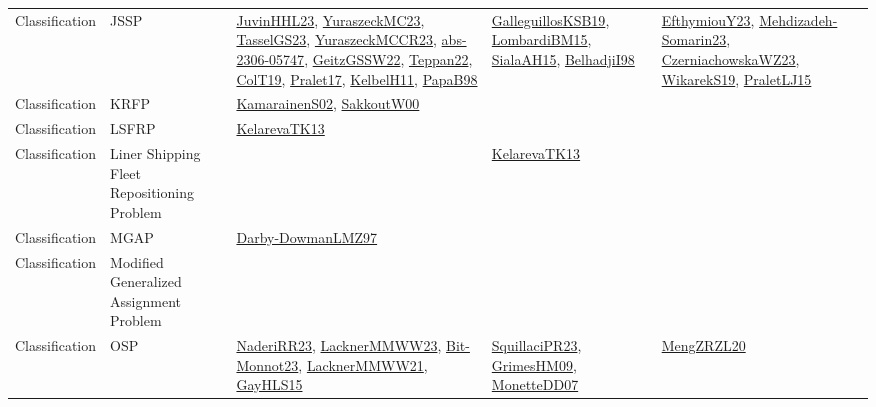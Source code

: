{\begin{longtable}{lp{3cm}>{\raggedright}p{6cm}>{\raggedright}p{6cm}p{8cm}}
Classification & JSSP & \href{papers/JuvinHHL23.pdf}{JuvinHHL23}\cite{JuvinHHL23}, \href{papers/YuraszeckMC23.pdf}{YuraszeckMC23}\cite{YuraszeckMC23}, \href{papers/TasselGS23.pdf}{TasselGS23}\cite{TasselGS23}, \href{articles/YuraszeckMCCR23.pdf}{YuraszeckMCCR23}\cite{YuraszeckMCCR23}, \href{articles/abs-2306-05747.pdf}{abs-2306-05747}\cite{abs-2306-05747}, \href{papers/GeitzGSSW22.pdf}{GeitzGSSW22}\cite{GeitzGSSW22}, \href{papers/Teppan22.pdf}{Teppan22}\cite{Teppan22}, \href{papers/ColT19.pdf}{ColT19}\cite{ColT19}, \href{papers/Pralet17.pdf}{Pralet17}\cite{Pralet17}, \href{articles/KelbelH11.pdf}{KelbelH11}\cite{KelbelH11}, \href{articles/PapaB98.pdf}{PapaB98}\cite{PapaB98} & \href{papers/GalleguillosKSB19.pdf}{GalleguillosKSB19}\cite{GalleguillosKSB19}, \href{papers/LombardiBM15.pdf}{LombardiBM15}\cite{LombardiBM15}, \href{papers/SialaAH15.pdf}{SialaAH15}\cite{SialaAH15}, \href{articles/BelhadjiI98.pdf}{BelhadjiI98}\cite{BelhadjiI98} & \href{papers/EfthymiouY23.pdf}{EfthymiouY23}\cite{EfthymiouY23}, \href{papers/Mehdizadeh-Somarin23.pdf}{Mehdizadeh-Somarin23}\cite{Mehdizadeh-Somarin23}, \href{articles/CzerniachowskaWZ23.pdf}{CzerniachowskaWZ23}\cite{CzerniachowskaWZ23}, \href{articles/WikarekS19.pdf}{WikarekS19}\cite{WikarekS19}, \href{papers/PraletLJ15.pdf}{PraletLJ15}\cite{PraletLJ15}\\
Classification & KRFP & \href{papers/KamarainenS02.pdf}{KamarainenS02}\cite{KamarainenS02}, \href{articles/SakkoutW00.pdf}{SakkoutW00}\cite{SakkoutW00} &  & \\
Classification & LSFRP & \href{papers/KelarevaTK13.pdf}{KelarevaTK13}\cite{KelarevaTK13} &  & \\
Classification & Liner Shipping Fleet Repositioning Problem &  & \href{papers/KelarevaTK13.pdf}{KelarevaTK13}\cite{KelarevaTK13} & \\
Classification & MGAP & \href{articles/Darby-DowmanLMZ97.pdf}{Darby-DowmanLMZ97}\cite{Darby-DowmanLMZ97} &  & \\
Classification & Modified Generalized Assignment Problem &  &  & \\
Classification & OSP & \href{articles/NaderiRR23.pdf}{NaderiRR23}\cite{NaderiRR23}, \href{articles/LacknerMMWW23.pdf}{LacknerMMWW23}\cite{LacknerMMWW23}, \href{papers/Bit-Monnot23.pdf}{Bit-Monnot23}\cite{Bit-Monnot23}, \href{papers/LacknerMMWW21.pdf}{LacknerMMWW21}\cite{LacknerMMWW21}, \href{papers/GayHLS15.pdf}{GayHLS15}\cite{GayHLS15} & \href{papers/SquillaciPR23.pdf}{SquillaciPR23}\cite{SquillaciPR23}, \href{papers/GrimesHM09.pdf}{GrimesHM09}\cite{GrimesHM09}, \href{papers/MonetteDD07.pdf}{MonetteDD07}\cite{MonetteDD07} & \href{articles/MengZRZL20.pdf}{MengZRZL20}\cite{MengZRZL20}\\

\end{longtable}}
